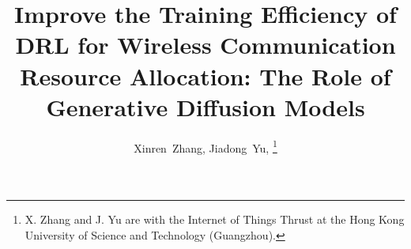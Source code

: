 \documentclass[comsoc,journal]{IEEEtran}
\begin{document}
\title{Improve the Training Efficiency of DRL for Wireless Communication Resource Allocation: The Role of Generative Diffusion Models}
%
\author{Xinren~Zhang,
        Jiadong~Yu, 
\thanks{
X. Zhang and J. Yu are with the Internet of Things Thrust at the Hong Kong University of Science and Technology (Guangzhou).
}}
\maketitle
\end{document}
